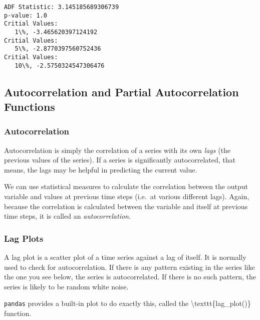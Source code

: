 \documentclass[11pt]{article}
\begin{document}
    \begin{Verbatim}[commandchars=\\\{\}]
ADF Statistic: 3.145185689306739
p-value: 1.0
Critial Values:
   1\%, -3.465620397124192
Critial Values:
   5\%, -2.8770397560752436
Critial Values:
   10\%, -2.5750324547306476
    \end{Verbatim}

    \hypertarget{autocorrelation-and-partial-autocorrelation-functions}{%
\subsection{Autocorrelation and Partial Autocorrelation
Functions}\label{autocorrelation-and-partial-autocorrelation-functions}}

\hypertarget{autocorrelation}{%
\subsubsection{Autocorrelation}\label{autocorrelation}}

Autocorrelation is simply the correlation of a series with its own
\emph{lags} (the previous values of the series). If a series is
significantly autocorrelated, that means, the lags may be helpful in
predicting the current value.

We can use statistical measures to calculate the correlation between the
output variable and values at previous time steps (i.e.~at various
different lags). Again, because the correlation is calculated between
the variable and itself at previous time steps, it is called an
\emph{autocorrelation}.

    \hypertarget{lag-plots}{%
\subsubsection{Lag Plots}\label{lag-plots}}

A lag plot is a scatter plot of a time series against a lag of itself.
It is normally used to check for autocorrelation. If there is any
pattern existing in the series like the one you see below, the series is
autocorrelated. If there is no such pattern, the series is likely to be
random white noise.

\texttt{pandas} provides a built-in plot to do exactly this, called the
\textbackslash{}texttt\{lag\_plot()\} function.
\end{document}
